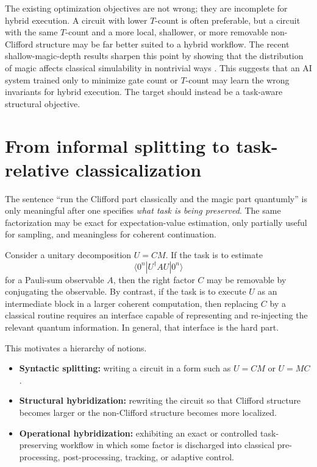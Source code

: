 \documentclass[11pt]{article}
\theoremstyle{remark}
\begin{document}
The existing optimization objectives are not wrong; they are incomplete for hybrid execution. A circuit with lower $T$-count is often preferable, but a circuit with the same $T$-count and a more local, shallower, or more removable non-Clifford structure may be far better suited to a hybrid workflow. The recent shallow-magic-depth results sharpen this point by showing that the distribution of magic affects classical simulability in nontrivial ways \cite{shallow_magic_2025}. This suggests that an AI system trained only to minimize gate count or $T$-count may learn the wrong invariants for hybrid execution. The target should instead be a task-aware structural objective.

\section{From informal splitting to task-relative classicalization}

The sentence ``run the Clifford part classically and the magic part quantumly'' is only meaningful after one specifies \emph{what task is being preserved}. The same factorization may be exact for expectation-value estimation, only partially useful for sampling, and meaningless for coherent continuation.

Consider a unitary decomposition $U = C M$. If the task is to estimate
\[
\langle 0^n | U^{\dagger} A U | 0^n \rangle
\]
for a Pauli-sum observable $A$, then the right factor $C$ may be removable by conjugating the observable. By contrast, if the task is to execute $U$ as an intermediate block in a larger coherent computation, then replacing $C$ by a classical routine requires an interface capable of representing and re-injecting the relevant quantum information. In general, that interface is the hard part.

This motivates a hierarchy of notions.

\begin{itemize}[leftmargin=1.5em]
    \item \textbf{Syntactic splitting:} writing a circuit in a form such as $U = C M$ or $U = M C$.
    \item \textbf{Structural hybridization:} rewriting the circuit so that Clifford structure becomes larger or the non-Clifford structure becomes more localized.
    \item \textbf{Operational hybridization:} exhibiting an exact or controlled task-preserving workflow in which some factor is discharged into classical pre-processing, post-processing, tracking, or adaptive control.
\end{itemize}
\end{document}
